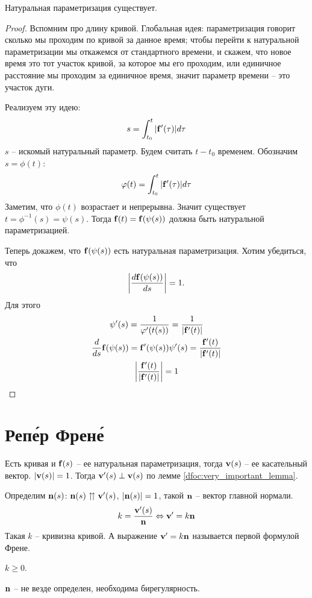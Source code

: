 \documentclass[main]{subfiles}
\begin{document}
\begin{theorem}
    Натуральная параметризация существует.
\end{theorem}
\begin{proof}
    Вспомним про длину кривой.
    Глобальная идея: параметризация говорит сколько мы проходим по кривой за данное время;
    чтобы перейти к натуральной параметризации мы откажемся от стандартного времени,
    и скажем, что новое время это тот участок кривой, за которое мы его проходим, или
    единичное расстояние мы проходим за единичное время, значит параметр времени -- это участок дуги.

    Реализуем эту идею:
    \[s = \int_{t_0}^t |\mathbf{f}'(\tau)| d\tau\]
    $s$ -- искомый натуральный параметр.
    Будем считать $t - t_0$ временем.
    Обозначим $s = \phi(t)$:
    \[\varphi(t) = \int_{t_0}^t |\mathbf{f}'(\tau)| d\tau\]
    Заметим, что $\phi(t)$ возрастает и непрерывна.
    Значит существует $t = \phi^{-1}(s)  = \psi(s)$.
    Тогда $\mathbf{f}(t) = \mathbf{f}(\psi(s))$ должна быть натуральной параметризацией.

    Теперь докажем, что $\mathbf{f}(\psi(s))$ есть натуральная параметризация.
    Хотим убедиться, что
    \[\left| \frac{d \mathbf{f}(\psi(s))}{ds}\right| = 1.\]
    Для этого
    \begin{gather*}
        \psi'(s) = \frac{1}{\varphi'(t(s))} = \frac{1}{|\mathbf{f}'(t)|}\\
        \frac{d}{ds}\mathbf{f}(\psi(s)) = \mathbf{f}'(\psi(s)) \psi'(s) = \frac{\mathbf{f}'(t)}{|\mathbf{f}'(t)|}\\
        \left| \frac{\mathbf{f}'(t)}{|\mathbf{f}'(t)|} \right| = 1
    \end{gather*}
\end{proof}

\section{Реп\'ер Френ\'е}

Есть кривая и $\mathbf{f}(s)$ -- ее натуральная параметризация, тогда $\mathbf{v}(s)$ -- ее касательный вектор.
$|\mathbf{v}(s)| = 1$.
Тогда $\mathbf{v}'(s) \perp \mathbf{v}(s)$ по лемме \ref{dfoc:very_important_lemma}.
\begin{definition}
    Определим $\mathbf{n}(s)$: $\mathbf{n}(s) \upuparrows \mathbf{v}'(s)$, $|\mathbf{n}(s)| = 1$,
    такой $\mathbf{n}$ -- вектор главной нормали.
    \[k = \frac{\mathbf{v} ' (s)}{\mathbf{n}} \Leftrightarrow \mathbf{v}' = k \mathbf{n}\]
    Такая $k$ -- кривизна кривой.
    А выражение $\mathbf{v}' = k \mathbf{n}$ называется первой формулой Френе.
\end{definition}
\begin{remark}
    $k \ge 0$.
\end{remark}
\begin{remark}
    $\mathbf{n}$ -- не везде определен, необходима бирегулярность.
\end{remark}
\end{document}
